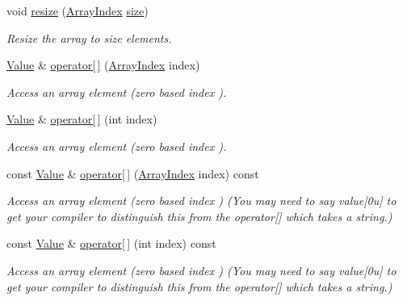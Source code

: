 \begin{DoxyCompactItemize}
void \hyperlink{classJson_1_1Value_aa284353271ada427dbfa04a42f2be407}{resize} (\hyperlink{classJson_1_1Value_a184a91566cccca7b819240f0d5561c7d}{Array\+Index} \hyperlink{classJson_1_1Value_a4ca8ee6c48a34ca6c2f131956bab5e05}{size})
\begin{DoxyCompactList}\small\item\em Resize the array to size elements. \end{DoxyCompactList}\item 
\hyperlink{classJson_1_1Value}{Value} \& \hyperlink{classJson_1_1Value_a7d99f5dba388cdaa152ce6ef933d64ef}{operator\mbox{[}$\,$\mbox{]}} (\hyperlink{classJson_1_1Value_a184a91566cccca7b819240f0d5561c7d}{Array\+Index} index)
\begin{DoxyCompactList}\small\item\em Access an array element (zero based index ). \end{DoxyCompactList}\item 
\hyperlink{classJson_1_1Value}{Value} \& \hyperlink{classJson_1_1Value_ac9182982c361e0ab621134d406e5f250}{operator\mbox{[}$\,$\mbox{]}} (int index)
\begin{DoxyCompactList}\small\item\em Access an array element (zero based index ). \end{DoxyCompactList}\item 
const \hyperlink{classJson_1_1Value}{Value} \& \hyperlink{classJson_1_1Value_af151919e8947c430e34bed2b0b128601}{operator\mbox{[}$\,$\mbox{]}} (\hyperlink{classJson_1_1Value_a184a91566cccca7b819240f0d5561c7d}{Array\+Index} index) const 
\begin{DoxyCompactList}\small\item\em Access an array element (zero based index ) (You may need to say \textquotesingle{}value\mbox{[}0u\mbox{]}\textquotesingle{} to get your compiler to distinguish this from the operator\mbox{[}\mbox{]} which takes a string.) \end{DoxyCompactList}\item 
const \hyperlink{classJson_1_1Value}{Value} \& \hyperlink{classJson_1_1Value_af9e02b38f4e63e491c300c20b275bdd7}{operator\mbox{[}$\,$\mbox{]}} (int index) const 
\begin{DoxyCompactList}\small\item\em Access an array element (zero based index ) (You may need to say \textquotesingle{}value\mbox{[}0u\mbox{]}\textquotesingle{} to get your compiler to distinguish this from the operator\mbox{[}\mbox{]} which takes a string.) \end{DoxyCompactList}\item 

\end{DoxyCompactItemize}
